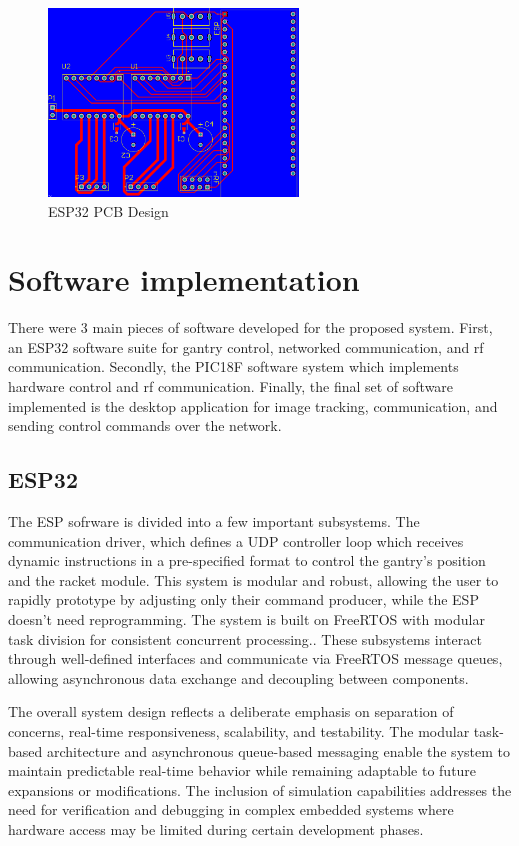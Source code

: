 \begin{figure}[h]
	\centering\includegraphics[height=5cm]{./images/ESP32_pcb}
	\caption{ESP32 PCB Design}
	\label{fig:esp-pcb}
\end{figure}


\section{Software implementation}

There were 3 main pieces of software developed for the proposed system. First, an ESP32 software suite for gantry control, networked communication, and rf communication. Secondly, the PIC18F software system which implements hardware control and rf communication. Finally, the final set of software implemented is the desktop application for image tracking, communication, and sending control commands over the network.

\subsection{ESP32}
The ESP sofrware is divided into a few important subsystems. The communication driver, which defines a UDP controller loop which receives dynamic instructions in a pre-specified format to control the gantry's position and the racket module. This system is modular and robust, allowing the user to rapidly prototype by adjusting only their command producer, while the ESP doesn't need reprogramming. The system is built on FreeRTOS with modular task division for consistent concurrent processing.. These subsystems interact through well-defined interfaces and communicate via FreeRTOS message queues, allowing asynchronous data exchange and decoupling between components.

The overall system design reflects a deliberate emphasis on separation of concerns, real-time responsiveness, scalability, and testability. The modular task-based architecture and asynchronous queue-based messaging enable the system to maintain predictable real-time behavior while remaining adaptable to future expansions or modifications. The inclusion of simulation capabilities addresses the need for verification and debugging in complex embedded systems where hardware access may be limited during certain development phases.

